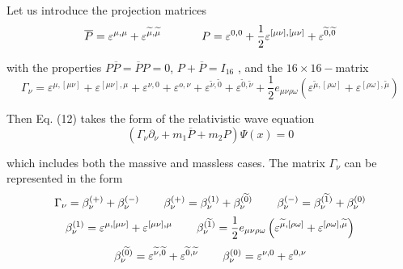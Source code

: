 \documentclass[a4paper,12pt]{article}
\begin{document}
Let us introduce the projection matrices
\begin{equation}
\overline{P}=\varepsilon ^{\mu ,\mu }+\varepsilon ^{\widetilde{\mu
}, \widetilde{\mu }}\hspace{0.5in}P=\varepsilon ^{0,0}+\frac
12\varepsilon ^{[\mu \nu ],[\mu \nu ]}+\varepsilon
^{\widetilde{0},\widetilde{0}} \label{13}
\end{equation}

with the properties $P\overline{P}=\overline{P}P=0$,
$P+\overline{P}=I_{16}$ , and the $16\times 16-$matrix
\begin{equation}
\Gamma _\nu =\varepsilon ^{\mu ,[\mu \nu ]}+\varepsilon ^{[\mu \nu
],\mu }+\varepsilon ^{\nu ,0}+\varepsilon ^{o,\nu }+\varepsilon
^{\widetilde{\nu }, \widetilde{0}}+\varepsilon
^{\widetilde{0},\widetilde{\nu }}+\frac 12e_{\mu \nu \rho \omega
}\left( \varepsilon ^{\widetilde{\mu },[\rho \omega ]}+\varepsilon
^{[\rho \omega ],\widetilde{\mu }}\right)  \label{14}
\end{equation}

Then Eq. (12) takes the form of the relativistic wave equation
\begin{equation}
\left( \Gamma _\nu \partial _\nu +m_1\overline{P}+m_2P\right) \Psi (x)=0
\label{15}
\end{equation}

which includes both the massive and massless cases. The matrix $\Gamma _\nu $
can be represented in the form
\[
\Gamma _\nu =\beta _\nu ^{(+)}+\beta _\nu ^{(-)}\hspace{0.3in}\beta _\nu
^{(+)}=\beta _\nu ^{(1)}+\beta _\nu ^{(\widetilde{0})}\hspace{0.3in}\beta
_\nu ^{(-)}=\beta _\nu ^{(\widetilde{1})}+\beta _\nu ^{(0)}
\]
\[
\beta _\nu ^{(1)}=\varepsilon ^{\mu ,[\mu \nu ]}+\varepsilon ^{[\mu \nu
],\mu }\hspace{0.3in}\beta _\nu ^{(\widetilde{1})}=\frac 12e_{\mu \nu \rho
\omega }\left( \varepsilon ^{\widetilde{\mu },[\rho \omega ]}+\varepsilon
^{[\rho \omega ],\widetilde{\mu }}\right)
\]
\begin{equation}
\beta _\nu ^{(\widetilde{0})}=\varepsilon ^{\widetilde{\nu
},\widetilde{0} }+\varepsilon ^{\widetilde{0},\widetilde{\nu
}}\hspace{0.3in}\beta _\nu ^{(0)}=\varepsilon ^{\nu
,0}+\varepsilon ^{0,\nu }  \label{16}
\end{equation}
\end{document}
